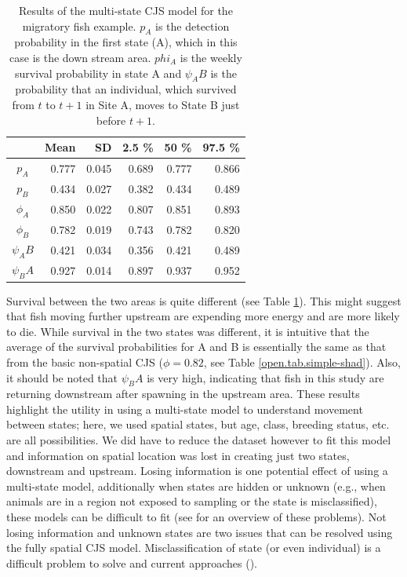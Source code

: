 \begin{table}
\centering
\caption{
  Results of the multi-state CJS model for the migratory fish example.  $p_A$ is the detection probability in the first state (A), which in this case is the down stream area.  $phi_A$ is the weekly survival probability in state A and $\psi_AB$ is the probability that an individual, which survived from $t$ to $t+1$ in Site A, moves to State B just
  before $t+1$.
}
\begin{tabular}{crrrrr}
\hline \hline
&       Mean   &  SD  &  2.5 \%   &   50 \%    &  97.5 \%  \\  \hline
$p_A$ & 0.777 & 0.045 & 0.689  & 0.777  & 0.866 \\
$p_B$  & 0.434  & 0.027 & 0.382 & 0.434  & 0.489 \\
$\phi_A$  & 0.850 & 0.022 & 0.807  & 0.851  & 0.893  \\
$\phi_B$  & 0.782  & 0.019 & 0.743  & 0.782& 0.820  \\
$\psi_AB$ & 0.421 & 0.034 & 0.356  & 0.421 &  0.489 \\
$\psi_BA$& 0.927 & 0.014 & 0.897  & 0.937 &  0.952  \\
\hline
\end{tabular}
\label{open.tab.multi-shad}
\end{table}

Survival between the two areas is quite different (see Table
\ref{open.tab.multi-shad}).  This might suggest that fish moving
further upstream are expending more energy and are more likely to die.
While survival in the two states was different, it is intuitive that
the average of the survival probabilities for A and B is essentially
the same as that from the basic non-spatial CJS ($\phi = 0.82$, see
Table \ref{open.tab.simple-shad}).  Also, it should be noted that
$\psi_BA$ is very high, indicating that fish in this study are
returning downstream after spawning in the upstream area.  These
results highlight the utility in using a multi-state model to
understand movement between states; here, we used spatial states, but
age, class, breeding status, etc. are all possibilities.  We did have
to reduce the  
dataset however to fit this model and information on spatial location
was lost in creating just two states, downstream and upstream.  Losing
information is one potential effect of using a multi-state model,
additionally when states are hidden or unknown (e.g., when animals are
in a region not exposed to sampling or the state is misclassified),
these models can be difficult to fit (see \citep{conn_cooch:2009} for
an overview of these problems).  Not losing information and unknown
states are two issues that can be resolved using the fully spatial CJS
model.  Misclassification of state (or even individual) is a difficult
problem to solve and current approaches (\cite{link_etal:2010,
  mcclintock_etal:inpress}).  

